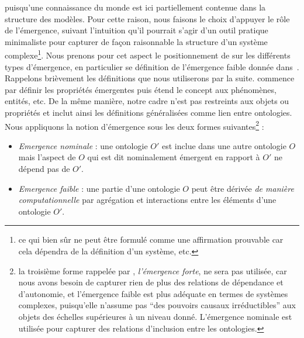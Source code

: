 {{puisqu'une connaissance du monde est ici partiellement contenue dans la structure des modèles. 
Pour cette raison, nous faisons le choix d'appuyer le rôle de l'émergence, suivant l'intuition qu'il pourrait s'agir d'un outil pratique minimaliste pour capturer de façon raisonnable la structure d'un système complexe\footnote{ce qui bien sûr ne peut être formulé comme une affirmation prouvable car cela dépendra de la définition d'un système, etc.}. Nous prenons pour cet aspect le positionnement de  sur les différents types d'émergence, en particulier se définition de l'émergence faible donnée dans~\cite{bedau2002downward}. 
 Rappelons brièvement les définitions que nous utiliserons par la suite.  commence par définir les propriétés émergentes puis étend le concept aux phénomènes, entités, etc. De la même manière, notre cadre n'est pas restreints aux objets ou propriétés et inclut ainsi les définitions généralisées comme lien entre ontologies. Nous appliquons la notion d'émergence sous les deux formes suivantes\footnote{la troisième forme rappelée par , \emph{l'émergence forte}, ne sera pas utilisée, car nous avons besoin de capturer rien de plus des relations de dépendance et d'autonomie, et l'émergence faible est plus adéquate en termes de systèmes complexes, puisqu'elle n'assume pas ``des pouvoirs causaux irréductibles'' aux objets des échelles supérieures à un niveau donné. L'émergence nominale est utilisée pour capturer des relations d'inclusion entre les ontologies.} :
\begin{itemize}
\item \emph{Emergence nominale} : une ontologie $O'$ est inclue dans une autre ontologie $O$ mais l'aspect de $O$ qui est dit nominalement émergent en rapport à $O'$ ne dépend pas de $O'$.
\item \emph{Emergence faible} : une partie d'une ontologie $O$ peut être dérivée \emph{de manière computationnelle} par agrégation et interactions entre les éléments d'une ontologie $O'$.
\end{itemize}
}


}
